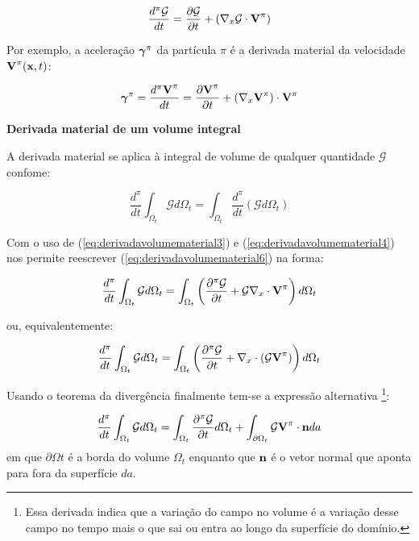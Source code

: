 \documentclass[
	11pt, %
	fleqn, %
	a4paper, %
]{LegrandOrangeBook}
\begin{document}
\begin{equation}
	\label{eq:derivadavolumematerial4}	
	\frac{d^\pi \mathcal{G}}{dt} = \dfrac{\partial \mathcal{G}}{\partial t} + (\nabla_x \mathcal{G} \cdot \textbf{V}^{\pi})
\end{equation}

Por exemplo, a aceleração $\bm{\gamma}^{\pi}$ da partícula $\pi$ é a derivada material da velocidade $\textbf{V}^{\pi}(\textbf{x},t)$:

\begin{equation}
	\label{eq:derivadavolumematerial5}	
	\bm{\gamma}^{\pi} = \dfrac{d^\pi \textbf{V}^{\pi}}{dt} = \dfrac{\partial \textbf{V}^{\pi}}{\partial t}+(\nabla_x \textbf{V}^{\pi})\cdot \textbf{V}^\pi
\end{equation}

\textbf{Derivada material de um volume integral}

A derivada material se aplica à integral de volume de qualquer quantidade $\mathcal{G}$ confome:

\begin{equation}
	\label{eq:derivadavolumematerial6}	
	\dfrac{d^\pi}{dt}\int_{\Omega_t}\mathcal{G}d\Omega_t = \int_{\Omega_t}\dfrac{d^\pi}{dt}(\mathcal{G}d\Omega_t)
\end{equation}

Com o uso de (\ref{eq:derivadavolumematerial3}) e (\ref{eq:derivadavolumematerial4}) nos permite reescrever (\ref{eq:derivadavolumematerial6}) na forma:

\begin{equation}
	\label{eq:derivadavolumematerial7}	
	\dfrac{d^\pi}{dt}\int_{\Omega_t}\mathcal{G}d\Omega_t = \int_{\Omega_t}\left(\dfrac{\partial^\pi \mathcal{G}}{\partial t}+\mathcal{G}\nabla_x \cdot \textbf{V}^{\pi}\right)d\Omega_t
\end{equation}

ou, equivalentemente:

\begin{equation}
	\label{eq:derivadavolumematerial8}	
	\dfrac{d^\pi}{dt}\int_{\Omega_t}\mathcal{G}d\Omega_t = \int_{\Omega_t}\left(\dfrac{\partial^\pi \mathcal{G}}{\partial t}+\nabla_x \cdot (\mathcal{G}\textbf{V}^{\pi})\right)d\Omega_t
\end{equation}

Usando o teorema da divergência finalmente tem-se a expressão alternativa \footnote{Essa derivada indica que a variação do campo no volume é a variação desse campo no tempo mais o que sai ou entra ao longo da superfície do domínio.}:

\begin{equation}
	\label{eq:derivadavolumematerial9}	
	\dfrac{d^\pi}{dt}\int_{\Omega_t}\mathcal{G}d\Omega_t = \int_{\Omega_t}\dfrac{\partial^\pi \mathcal{G}}{\partial t}d\Omega_t+\int_{\partial \Omega_t} \mathcal{G}\textbf{V}^{\pi} \cdot \textbf{n} da
\end{equation}
em que $\partial \Omega t$ é a borda do volume $\Omega_t$ enquanto que $\textbf{n}$ é o vetor normal que aponta para fora da superfície $da$.
\end{document}
